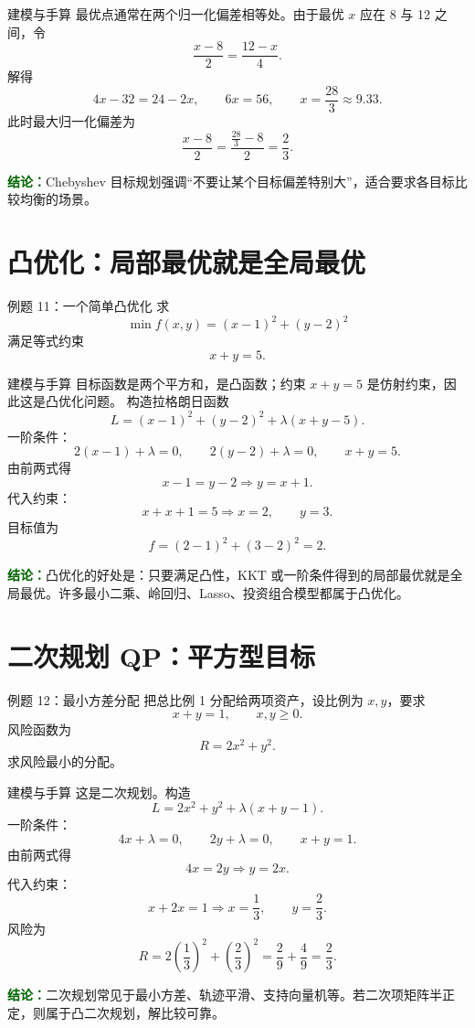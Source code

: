 \documentclass[UTF8,12pt,a4paper]{ctexart}
\newcommand{\conclusion}[1]{\par\smallskip\noindent\textcolor{darkgreen}{\textbf{结论：}}#1\par\smallskip}
\begin{document}
\begin{solbox}{建模与手算}
最优点通常在两个归一化偏差相等处。由于最优 $x$ 应在 8 与 12 之间，令
\[
\frac{x-8}{2}=\frac{12-x}{4}.
\]
解得
\[
4x-32=24-2x,
\qquad 6x=56,
\qquad x=\frac{28}{3}\approx9.33.
\]
此时最大归一化偏差为
\[
\frac{x-8}{2}=\frac{\frac{28}{3}-8}{2}=\frac{2}{3}.
\]
\end{solbox}
\conclusion{Chebyshev 目标规划强调“不要让某个目标偏差特别大”，适合要求各目标比较均衡的场景。}

\section{凸优化：局部最优就是全局最优}
\begin{examplebox}{例题 11：一个简单凸优化}
求
\[
\min f(x,y)=(x-1)^2+(y-2)^2
\]
满足等式约束
\[
x+y=5.
\]
\end{examplebox}

\begin{solbox}{建模与手算}
目标函数是两个平方和，是凸函数；约束 $x+y=5$ 是仿射约束，因此这是凸优化问题。
构造拉格朗日函数
\[
L=(x-1)^2+(y-2)^2+\lambda(x+y-5).
\]
一阶条件：
\[
2(x-1)+\lambda=0,
\qquad 2(y-2)+\lambda=0,
\qquad x+y=5.
\]
由前两式得
\[
x-1=y-2\Rightarrow y=x+1.
\]
代入约束：
\[
x+x+1=5\Rightarrow x=2,
\qquad y=3.
\]
目标值为
\[
f=(2-1)^2+(3-2)^2=2.
\]
\end{solbox}
\conclusion{凸优化的好处是：只要满足凸性，KKT 或一阶条件得到的局部最优就是全局最优。许多最小二乘、岭回归、Lasso、投资组合模型都属于凸优化。}

\section{二次规划 QP：平方型目标}
\begin{examplebox}{例题 12：最小方差分配}
把总比例 1 分配给两项资产，设比例为 $x,y$，要求
\[
x+y=1,
\qquad x,y\ge0.
\]
风险函数为
\[
R=2x^2+y^2.
\]
求风险最小的分配。
\end{examplebox}

\begin{solbox}{建模与手算}
这是二次规划。构造
\[
L=2x^2+y^2+\lambda(x+y-1).
\]
一阶条件：
\[
4x+\lambda=0,
\qquad 2y+\lambda=0,
\qquad x+y=1.
\]
由前两式得
\[
4x=2y\Rightarrow y=2x.
\]
代入约束：
\[
x+2x=1\Rightarrow x=\frac13,
\qquad y=\frac23.
\]
风险为
\[
R=2\left(\frac13\right)^2+\left(\frac23\right)^2=\frac{2}{9}+\frac{4}{9}=\frac23.
\]
\end{solbox}
\conclusion{二次规划常见于最小方差、轨迹平滑、支持向量机等。若二次项矩阵半正定，则属于凸二次规划，解比较可靠。}
\end{document}
